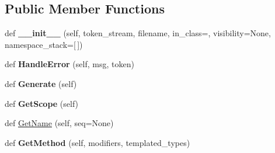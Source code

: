 \subsection*{Public Member Functions}
\begin{DoxyCompactItemize}
\item 
\mbox{\label{classtests_1_1libs_1_1googletest-master_1_1googlemock_1_1scripts_1_1generator_1_1cpp_1_1ast_1_1AstBuilder_acb97ab59e5c874efe8063682c6709964}} 
def {\bfseries \+\_\+\+\_\+init\+\_\+\+\_\+} (self, token\+\_\+stream, filename, in\+\_\+class=\textquotesingle{}\textquotesingle{}, visibility=None, namespace\+\_\+stack=\mbox{[}$\,$\mbox{]})
\item 
\mbox{\label{classtests_1_1libs_1_1googletest-master_1_1googlemock_1_1scripts_1_1generator_1_1cpp_1_1ast_1_1AstBuilder_a9bc378a5ffee71be90e9cc64d2fc92a9}} 
def {\bfseries Handle\+Error} (self, msg, token)
\item 
\mbox{\label{classtests_1_1libs_1_1googletest-master_1_1googlemock_1_1scripts_1_1generator_1_1cpp_1_1ast_1_1AstBuilder_a3901e5cf04ae47c06f74f8835277143f}} 
def {\bfseries Generate} (self)
\item 
\mbox{\label{classtests_1_1libs_1_1googletest-master_1_1googlemock_1_1scripts_1_1generator_1_1cpp_1_1ast_1_1AstBuilder_a462d6c3cd088f3438758680f4ce61716}} 
def {\bfseries Get\+Scope} (self)
\item 
def \hyperlink{classtests_1_1libs_1_1googletest-master_1_1googlemock_1_1scripts_1_1generator_1_1cpp_1_1ast_1_1AstBuilder_a781612af496b683c1603dbfd72b4b2a2}{Get\+Name} (self, seq=None)
\item 
\mbox{\label{classtests_1_1libs_1_1googletest-master_1_1googlemock_1_1scripts_1_1generator_1_1cpp_1_1ast_1_1AstBuilder_a47e75e4540972b1001027b05062fa9b1}} 
def {\bfseries Get\+Method} (self, modifiers, templated\+\_\+types)

\end{DoxyCompactItemize}
